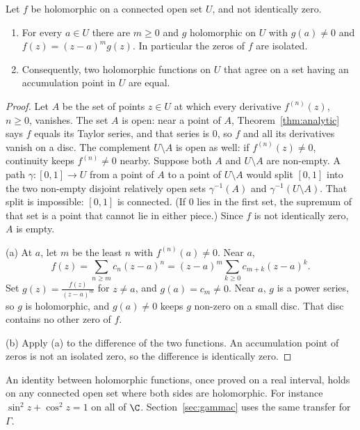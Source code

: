 \begin{theorem}\label{thm:identity}
Let $f$ be holomorphic on a connected open set $U$, and not identically zero.
\begin{enumerate}[label=(\alph*)]
\item For every $a\in U$ there are $m\ge0$ and $g$ holomorphic on $U$ with $g(a)\ne0$ and $f(z)=(z-a)^mg(z)$. In particular the zeros of $f$ are isolated.
\item Consequently, two holomorphic functions on $U$ that agree on a set having an accumulation point in $U$ are equal.
\end{enumerate}
\end{theorem}
\begin{proof}
Let $A$ be the set of points $z\in U$ at which every derivative $f^{(n)}(z)$, $n\ge0$, vanishes. The set $A$ is open: near a point of $A$, Theorem~\ref{thm:analytic} says $f$ equals its Taylor series, and that series is $0$, so $f$ and all its derivatives vanish on a disc. The complement $U\setminus A$ is open as well: if $f^{(n)}(z)\ne0$, continuity keeps $f^{(n)}\ne0$ nearby. Suppose both $A$ and $U\setminus A$ are non-empty. A path $\gamma:[0,1]\to U$ from a point of $A$ to a point of $U\setminus A$ would split $[0,1]$ into the two non-empty disjoint relatively open sets $\gamma^{-1}(A)$ and $\gamma^{-1}(U\setminus A)$. That split is impossible: $[0,1]$ is connected. (If $0$ lies in the first set, the supremum of that set is a point that cannot lie in either piece.) Since $f$ is not identically zero, $A$ is empty.

(a) At $a$, let $m$ be the least $n$ with $f^{(n)}(a)\ne0$. Near $a$,
\[
f(z)=\sum_{n\ge m}c_n(z-a)^n=(z-a)^m\sum_{k\ge0}c_{m+k}(z-a)^k.
\]
Set $g(z)=\frac{f(z)}{(z-a)^m}$ for $z\ne a$, and $g(a)=c_m\ne0$. Near $a$, $g$ is a power series, so $g$ is holomorphic, and $g(a)\ne0$ keeps $g$ non-zero on a small disc. That disc contains no other zero of $f$.

(b) Apply (a) to the difference of the two functions. An accumulation point of zeros is not an isolated zero, so the difference is identically zero.
\end{proof}

An identity between holomorphic functions, once proved on a real interval, holds on any connected open set where both sides are holomorphic. For instance $\sin^2z+\cos^2z=1$ on all of $\C$. Section~\ref{sec:gammac} uses the same transfer for $\Gamma$.

